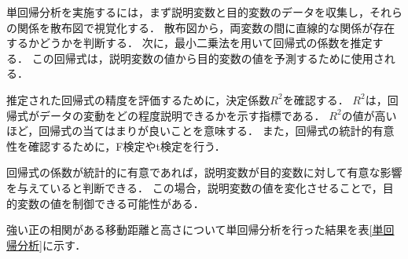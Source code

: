 \documentclass[titlepage,a4paper]{jsarticle}
\begin{document}
単回帰分析を実施するには，まず説明変数と目的変数のデータを収集し，それらの関係を散布図で視覚化する．
散布図から，両変数の間に直線的な関係が存在するかどうかを判断する．
次に，最小二乗法を用いて回帰式の係数を推定する．
この回帰式は，説明変数の値から目的変数の値を予測するために使用される．

推定された回帰式の精度を評価するために，決定係数$R^{2}$を確認する．
$R^{2}$は，回帰式がデータの変動をどの程度説明できるかを示す指標である．
$R^{2}$の値が高いほど，回帰式の当てはまりが良いことを意味する．
また，回帰式の統計的有意性を確認するために，F検定やt検定を行う．

回帰式の係数が統計的に有意であれば，説明変数が目的変数に対して有意な影響を与えていると判断できる．
この場合，説明変数の値を変化させることで，目的変数の値を制御できる可能性がある．

強い正の相関がある移動距離と高さについて単回帰分析を行った結果を表\ref{単回帰分析}に示す．
\end{document}
